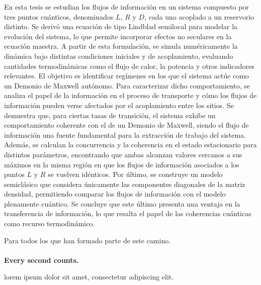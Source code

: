 \documentclass[
	spanish, %
	letterpaper, oneside
]{book}
\begin{document}
\templatePortrait

\templatePagecfg

\begin{abstractd}
En esta tesis se estudian los flujos de información en un sistema compuesto por tres puntos cuánticos, denominados \( L \), \( R \) y \( D \), cada uno acoplado a un reservorio distinto. Se derivó una ecuación de tipo Lindblad semilocal para modelar la evolución del sistema, lo que permite incorporar efectos no seculares en la ecuación maestra. A partir de esta formulación, se simula numéricamente la dinámica bajo distintas condiciones iniciales y de acoplamiento, evaluando cantidades termodinámicas como el flujo de calor, la potencia y otros indicadores relevantes. El objetivo es identificar regímenes en los que el sistema actúe como un Demonio de Maxwell autónomo. Para caracterizar dicho comportamiento, se analiza el papel de la información en el proceso de transporte y cómo los flujos de información pueden verse afectados por el acoplamiento entre los sitios. Se demuestra que, para ciertas tasas de transición, el sistema exhibe un comportamiento coherente con el de un Demonio de Maxwell, siendo el flujo de información una fuente fundamental para la extracción de trabajo del sistema. Además, se calculan la concurrencia y la coherencia en el estado estacionario para distintos parámetros, encontrando que ambas alcanzan valores cercanos a sus máximos en la misma región en que los flujos de información asociados a los puntos \( L \) y \( R \) se vuelven idénticos. Por último, se construye un modelo semiclásico que considera únicamente las componentes diagonales de la matriz densidad, permitiendo comparar los flujos de información con el modelo plenamente cuántico. Se concluye que este último presenta una ventaja en la transferencia de información, lo que resalta el papel de las coherencias cuánticas como recurso termodinámico.
\end{abstractd}


\begin{dedicatory}
	Para todos los que han formado parte de este camino.\\
	~ \\
	\textbf{Every second counts.}
\end{dedicatory}

\begin{acknowledgments}
	lorem ipsum dolor sit amet, consectetur adipiscing elit. \\
\end{acknowledgments}

\templateIndex

\templateFinalcfg



\end{document}
